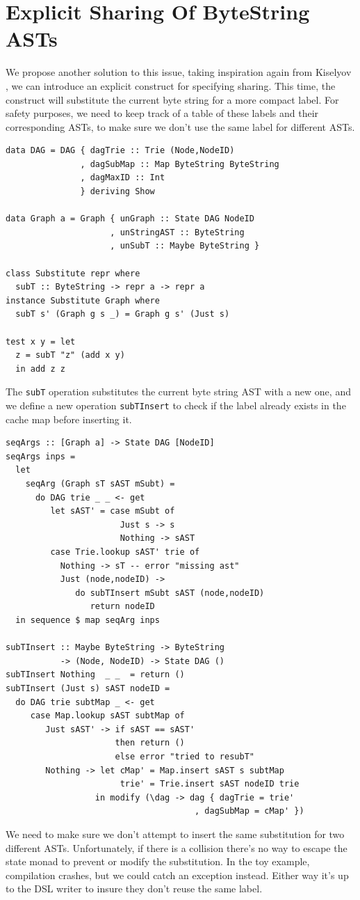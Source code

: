 \documentclass[runningheads]{llncs}
\begin{document}
\section{Explicit Sharing Of ByteString ASTs}
We propose another solution to this issue, taking inspiration again from Kiselyov 
\cite{kiselyov:sharing}, we can introduce an explicit construct for specifying
sharing. This time, the construct will substitute the current byte string for a
more compact label. For safety purposes, we need to keep track of a table of
these labels and their corresponding ASTs, to make sure we don't use the same label for different ASTs.
\begin{verbatim}
data DAG = DAG { dagTrie :: Trie (Node,NodeID)
               , dagSubMap :: Map ByteString ByteString
               , dagMaxID :: Int
               } deriving Show

data Graph a = Graph { unGraph :: State DAG NodeID
                     , unStringAST :: ByteString
                     , unSubT :: Maybe ByteString }

class Substitute repr where
  subT :: ByteString -> repr a -> repr a
instance Substitute Graph where
  subT s' (Graph g s _) = Graph g s' (Just s)

test x y = let
  z = subT "z" (add x y)
  in add z z
\end{verbatim}

The \texttt{subT} operation substitutes the current byte string AST with a new one, and
we define a new operation \texttt{subTInsert} to check if
the label already exists in the cache map before inserting it.
\begin{verbatim}
seqArgs :: [Graph a] -> State DAG [NodeID]
seqArgs inps =
  let
    seqArg (Graph sT sAST mSubt) =
      do DAG trie _ _ <- get
         let sAST' = case mSubt of
                       Just s -> s
                       Nothing -> sAST
         case Trie.lookup sAST' trie of
           Nothing -> sT -- error "missing ast"
           Just (node,nodeID) ->
              do subTInsert mSubt sAST (node,nodeID)
                 return nodeID
  in sequence $ map seqArg inps

subTInsert :: Maybe ByteString -> ByteString
           -> (Node, NodeID) -> State DAG ()
subTInsert Nothing  _ _  = return ()
subTInsert (Just s) sAST nodeID =
  do DAG trie subtMap _ <- get
     case Map.lookup sAST subtMap of
        Just sAST' -> if sAST == sAST'
                      then return ()
                      else error "tried to resubT"
        Nothing -> let cMap' = Map.insert sAST s subtMap
                       trie' = Trie.insert sAST nodeID trie
                  in modify (\dag -> dag { dagTrie = trie'
                                      , dagSubMap = cMap' })
\end{verbatim}
We need to make sure we don't attempt to insert the same substitution for two
different ASTs. Unfortunately, if there is a collision there's no way to escape
the state monad to prevent or modify the substitution.
In the toy example, compilation crashes, but we could catch an exception instead.
Either way it's up to the DSL
writer to insure they don't reuse the same label.
\end{document}
